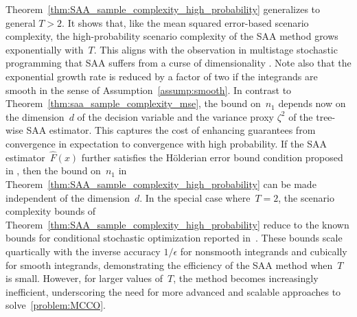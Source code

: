 \documentclass[11pt]{article}
\let\hat\widehat
\begin{document}
Theorem~\ref{thm:SAA_sample_complexity_high_probability} generalizes \cite[Corollary~4.2]{hu2020sample} to general $T>2$. It shows that, like the mean squared error-based scenario complexity, the high-probability scenario complexity of the SAA method grows exponentially with~$T$. This aligns with the observation in multistage stochastic programming that SAA suffers from a curse of dimensionality \cite{shapiro2006complexity, reaiche2016note}. Note also that the exponential growth rate is reduced by a factor of two if the integrands are smooth in the sense of Assumption~\ref{assump:smooth}. In contrast to Theorem~\ref{thm:saa_sample_complexity_mse}, the bound on~$n_1$ depends now on the dimension~$d$ of the decision variable and the variance proxy $\zeta^2$ of the tree-wise SAA estimator. This captures the cost of enhancing guarantees from convergence in expectation to convergence with high probability. If the SAA estimator~$\hat{F}(x)$ further satisfies the Hölderian error bound condition proposed in \citep[Assumption~4.1]{hu2020sample}, then the bound on~$n_1$ in Theorem~\ref{thm:SAA_sample_complexity_high_probability} can be made independent of the dimension~$d$. In the special case where~$T=2$, the scenario complexity bounds of Theorem~\ref{thm:SAA_sample_complexity_high_probability} reduce to the known bounds for conditional stochastic optimization reported in~\citep{hu2020sample}. These bounds scale quartically with the inverse accuracy $1/\epsilon$ for nonsmooth integrands and cubically for smooth integrands, demonstrating the efficiency of the SAA method when~$T$ is small. However, for larger values of~$T$, the method becomes increasingly inefficient, underscoring the need for more advanced and scalable approaches to solve~\eqref{problem:MCCO}. 

\end{document}
